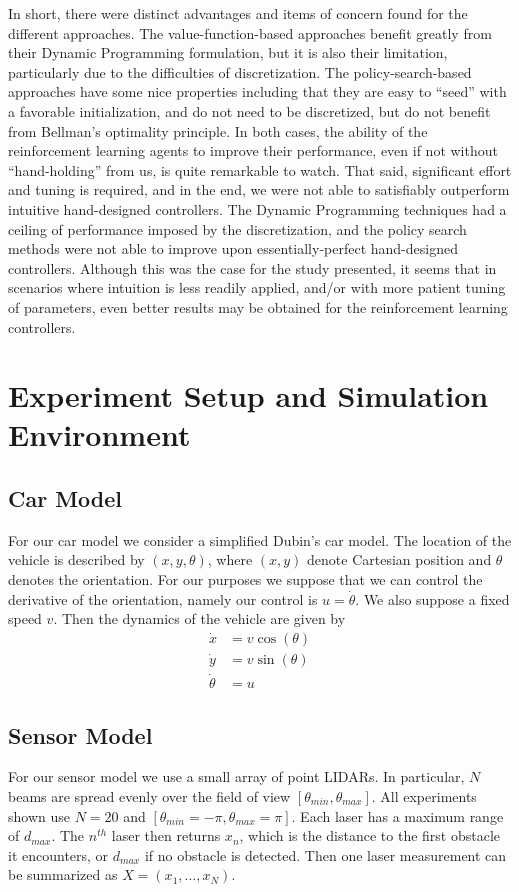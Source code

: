 \documentclass{article}
\begin{document}
In short, there were distinct advantages and items of concern found for the different approaches.    The value-function-based approaches benefit greatly from their Dynamic Programming formulation, but it is also their limitation, particularly due to the difficulties of discretization.  The policy-search-based approaches have some nice properties including that they are easy to ``seed'' with a favorable initialization, and do not need to be discretized, but do not benefit from Bellman's optimality principle.  In both cases, the ability of the reinforcement learning agents to improve their performance, even if not without ``hand-holding'' from us, is quite remarkable to watch.  That said, significant effort and tuning is required, and in the end, we were not able to satisfiably outperform intuitive hand-designed controllers.  The Dynamic Programming techniques had a ceiling of performance imposed by the discretization, and the policy search methods were not able to improve upon essentially-perfect hand-designed controllers.  Although this was the case for the study presented, it seems that in scenarios where intuition is less readily applied, and/or with more patient tuning of parameters, even better results may be obtained for the reinforcement learning controllers.

\section{Experiment Setup and Simulation Environment}

\subsection{Car Model}

For our car model we consider a simplified Dubin's car model. The location of the vehicle is described by $(x,y,\theta)$, where $(x,y)$ denote Cartesian position and $\theta$ denotes the orientation. For our purposes we suppose that we can control the derivative of the orientation, namely our control is $u = \dot{\theta}$. We also suppose a fixed speed $v$. Then the dynamics of the vehicle are given by
%
%
\begin{align}
\dot{x} &= v \cos(\theta) \\ 
\dot{y} &= v \sin(\theta)\\ 
\dot{\theta} &= u
\end{align}
%
%
%

\subsection{Sensor Model}
For our sensor model we use a small array of point LIDARs. In particular, $N$ beams are spread evenly over the field of view $[\theta_{min},\theta_{max}]$.  All experiments shown use $N=20$ and $[\theta_{min}=-\pi,\theta_{max}=\pi]$.   Each laser has a maximum range of $d_{max}$. The $n^{th}$ laser then returns $x_n$, which is the distance to the first obstacle it encounters, or $d_{max}$ if no obstacle is detected. Then one laser measurement can be summarized as $X = (x_1,\ldots,x_N)$.
\end{document}
